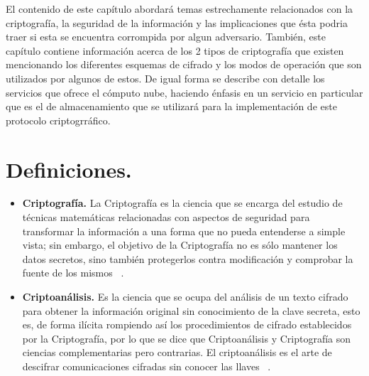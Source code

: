 
El contenido de este capítulo abordará temas estrechamente relacionados con la criptografía, la seguridad de la información y las implicaciones que ésta podria traer si esta se encuentra corrompida por algun adversario. También, este capítulo contiene información acerca de los 2 tipos de criptografía que existen mencionando los diferentes esquemas de cifrado y los modos de operación que son utilizados por algunos de estos. De igual forma se describe con detalle los servicios que ofrece el cómputo nube, haciendo énfasis en un servicio en particular que es el de almacenamiento que se utilizará para la implementación de este protocolo criptogrráfico. 

\section{Definiciones. }
 \begin{itemize}

	\item \textbf{Criptografía. }
	 	La Criptografía es la ciencia que se encarga del estudio de técnicas matemáticas relacionadas con aspectos de seguridad  para transformar la información a una forma que no pueda entenderse a simple vista; sin embargo, el objetivo de la Criptografía no es sólo 	mantener los datos secretos, sino también protegerlos contra modificación y comprobar la fuente de los mismos ~\cite{menezes}.
	\item \textbf{Criptoanálisis. }
		Es la ciencia que se ocupa del análisis de un texto cifrado para obtener la información original sin conocimiento de la clave secreta, esto es, de forma ilícita rompiendo así los procedimientos de cifrado establecidos por la Criptografía, por lo que se dice que 		Criptoanálisis y Criptografía son ciencias complementarias pero contrarias. El criptoanálisis es el arte de descifrar comunicaciones cifradas sin conocer las llaves  ~\cite{cripto}.
 \end{itemize}


